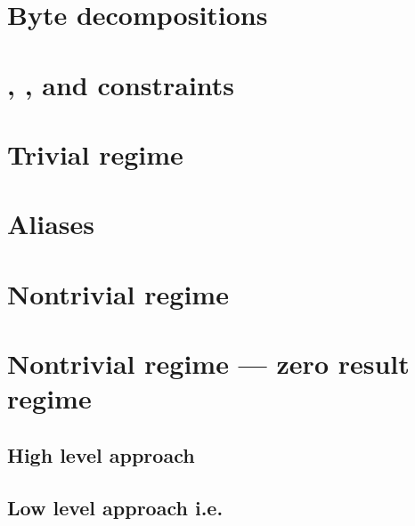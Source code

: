\section{Byte decompositions}                                                    \label{alu: mul: byte decompositions}                                                
\section{\tinyBase{}, \tinyExponent{}, \oli{} and \resVanishes{} constraints}    \label{alu: mul: tiny base, tiny exponent, oli and result vanishes binary columns}   
\section{Trivial regime}                                                         \label{alu: mul: trivial regime}                                                     
\section{Aliases}                                                                \label{alu: mul: aliases}                                                            
\section{Nontrivial  regime}                                           \label{alu: mul: nontrivial mul regime}                                              
\section{Nontrivial  regime --- zero result regime}                    \label{alu: mul: nontrivial mul regime: zero result}                                                            
\subsection{High level approach}                                                 \label{alu: mul: nontrivial mul regime: zero result approach}                        
\subsection{Low level approach i.e. \prepareLowerBoundOnTwoAdicity{}}            \label{alu: mul: nontrivial mul regime: zero result approach}                        
